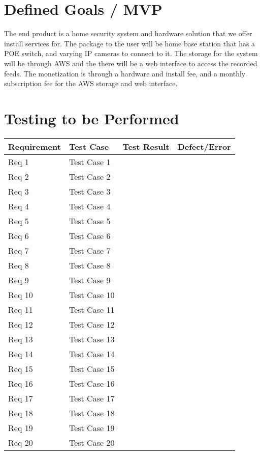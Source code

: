 \documentclass{report}
\begin{document}
\chapter{Defined Goals / MVP}
The end product is a home security system and hardware solution that we offer install services for. 
The package to the user will be home base station that has a POE switch, and varying IP cameras to connect to it. 
The storage for the system will be through AWS and the there will be a web interface to access the recorded feeds. 
The monetization is through a hardware and install fee, and a monthly subscription fee for the AWS storage and web interface. 
\chapter{Testing to be Performed}
\begin{tabular}{|l|l|l|l|}
\hline
Requirement & Test Case & Test Result & Defect/Error \\
\hline
Req 1 & Test Case 1 &  &  \\
\hline
Req 2 & Test Case 2 &  &  \\
\hline
Req 3 & Test Case 3 &  &  \\
\hline
Req 4 & Test Case 4 &  &  \\
\hline
Req 5 & Test Case 5 &  &  \\
\hline
Req 6 & Test Case 6 &  &  \\
\hline
Req 7 & Test Case 7 &  &  \\
\hline
Req 8 & Test Case 8 &  &  \\
\hline
Req 9 & Test Case 9 &  &  \\
\hline
Req 10 & Test Case 10 &  &  \\
\hline
Req 11 & Test Case 11 &  &  \\
\hline
Req 12 & Test Case 12 &  &  \\
\hline
Req 13 & Test Case 13 &  &  \\
\hline
Req 14 & Test Case 14 &  &  \\
\hline
Req 15 & Test Case 15 &  &  \\
\hline
Req 16 & Test Case 16 &  &  \\
\hline
Req 17 & Test Case 17 &  &  \\
\hline
Req 18 & Test Case 18 &  &  \\
\hline
Req 19 & Test Case 19 &  &  \\
\hline
Req 20 & Test Case 20 &  &  \\
\hline
\end{tabular}
\end{document}
